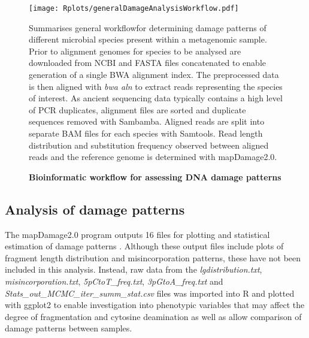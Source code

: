 \documentclass[12pt, a4paper]{article}
\begin{document}
\begin{figure}[ht]
\singlespace
\begin{center}
\texttt{[image: Rplots/generalDamageAnalysisWorkflow.pdf]}
\end{center}
\caption[Bioinformatic workflow for assessing DNA damage patterns]{\textbf{Bioinformatic workflow for assessing DNA damage patterns}} \small{Summarises general workflowfor determining damage patterns of different microbial species present within a metagenomic sample. Prior to alignment genomes for species to be analysed are downloaded from NCBI and FASTA files concatenated to enable generation of a single BWA alignment index. The preprocessed data is then aligned with \textit{bwa aln} to extract reads representing the species of interest. As ancient sequencing data typically contains a high level of PCR duplicates, alignment files are sorted and duplicate sequences removed with Sambamba. Aligned reads are split into separate BAM files for each species with Samtools. Read length distribution and substitution frequency observed between aligned reads and the reference genome is determined with mapDamage2.0.}\label{fig:damageAnalysisWorkflow}
\end{figure}

\subsection{Analysis of damage patterns}

The mapDamage2.0 program outputs 16 files for plotting and statistical estimation of damage patterns \cite{Jonsson:2013aa}. 
Although these output files include plots of fragment length distribution and misincorporation patterns, these have not been included in this analysis. 
Instead, raw data from the \textit{lgdistribution.txt}, \textit{misincorporation.txt}, \textit{5pCtoT\_freq.txt}, \emph{3pGtoA\_freq.txt} and \textit{Stats\_out\_MCMC\_iter\_summ\_stat.csv} files was imported into R \cite[Version 3.3.2]{R-Core-Team:2016aa} and plotted with ggplot2 \cite[Version 2.2.1]{Wickham:2009aa} to enable investigation into phenotypic variables that may affect the degree of fragmentation and cytosine deamination as well as allow comparison of damage patterns between samples.

\end{document}
